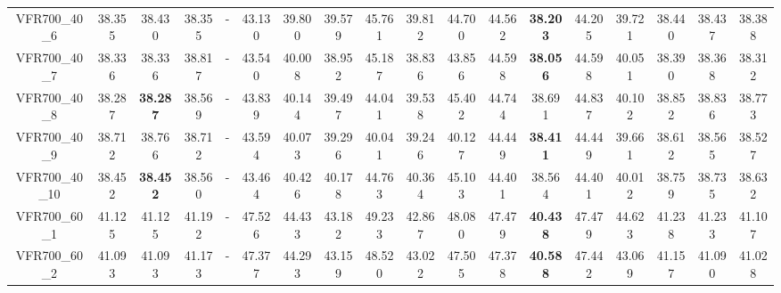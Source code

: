 \begin{tabular}{cc|ccc|ccccccccccccc}
VFR700\_40\_6      & 38.355           & 38.430           & 38.355           & -                & 43.130           & 39.800           & 39.579           & 45.761           & 39.812           & 44.700           & 44.562           & {\bf 38.203}     & 44.205           & 39.721           & 38.440           & 38.437           & 38.388          \\ 
VFR700\_40\_7      & 38.336           & 38.336           & 38.817           & -                & 43.540           & 40.008           & 38.952           & 45.187           & 38.836           & 43.856           & 44.598           & {\bf 38.056}     & 44.598           & 40.051           & 38.390           & 38.368           & 38.312          \\ 
VFR700\_40\_8      & 38.287           & {\bf 38.287}     & 38.569           & -                & 43.839           & 40.144           & 39.497           & 44.041           & 39.538           & 45.402           & 44.744           & 38.691           & 44.837           & 40.102           & 38.852           & 38.836           & 38.773          \\ 
VFR700\_40\_9      & 38.712           & 38.766           & 38.712           & -                & 43.594           & 40.073           & 39.296           & 40.041           & 39.246           & 40.127           & 44.449           & {\bf 38.411}     & 44.449           & 39.661           & 38.612           & 38.565           & 38.527          \\ 
VFR700\_40\_10     & 38.452           & {\bf 38.452}     & 38.560           & -                & 43.464           & 40.426           & 40.178           & 44.763           & 40.364           & 45.103           & 44.401           & 38.564           & 44.401           & 40.012           & 38.759           & 38.735           & 38.632          \\ 
VFR700\_60\_1      & 41.125           & 41.125           & 41.192           & -                & 47.526           & 44.433           & 43.182           & 49.233           & 42.867           & 48.080           & 47.479           & {\bf 40.438}     & 47.479           & 44.623           & 41.238           & 41.233           & 41.107          \\ 
VFR700\_60\_2      & 41.093           & 41.093           & 41.173           & -                & 47.377           & 44.293           & 43.159           & 48.520           & 43.022           & 47.505           & 47.378           & {\bf 40.588}     & 47.442           & 43.069           & 41.157           & 41.090           & 41.028          \\ 

\end{tabular}

